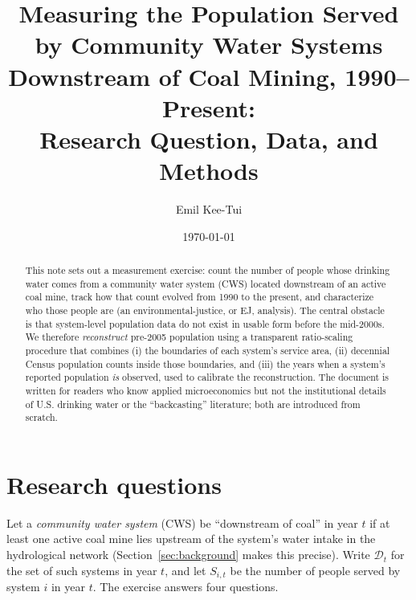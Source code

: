 \documentclass[11pt]{article}
\title{Measuring the Population Served by Community Water Systems\\
Downstream of Coal Mining, 1990--Present:\\
\large Research Question, Data, and Methods}
\author{Emil Kee-Tui}
\date{\today}
\newcommand{\popserved}{\ensuremath{S}}
\begin{document}
\maketitle

\begin{abstract}
\noindent
This note sets out a measurement exercise: count the number of people whose
drinking water comes from a community water system (CWS) located downstream of an
active coal mine, track how that count evolved from 1990 to the present, and
characterize who those people are (an environmental-justice, or EJ, analysis). The
central obstacle is that system-level population data do not exist in usable form
before the mid-2000s. We therefore \emph{reconstruct} pre-2005 population using a
transparent ratio-scaling procedure that combines (i) the boundaries of each
system's service area, (ii) decennial Census population counts inside those
boundaries, and (iii) the years when a system's reported population \emph{is}
observed, used to calibrate the reconstruction. The document is written for readers
who know applied microeconomics but not the institutional details of U.S. drinking
water or the ``backcasting'' literature; both are introduced from scratch.
\end{abstract}

\section{Research questions}
\label{sec:questions}

Let a \emph{community water system} (CWS) be ``downstream of coal'' in year $t$ if at
least one active coal mine lies upstream of the system's water intake in the
hydrological network (Section~\ref{sec:background} makes this precise). Write
$\mathcal{D}_t$ for the set of such systems in year $t$, and let $\popserved_{i,t}$
be the number of people served by system $i$ in year $t$. The exercise answers four
questions.
\end{document}
